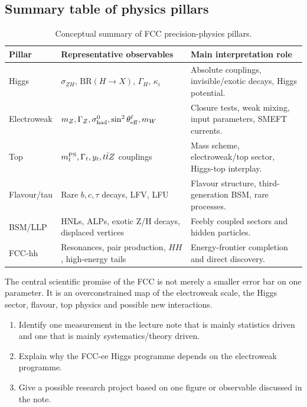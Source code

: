 \documentclass[11pt,a4paper]{article}
\newcommand{\BR}{\mathrm{BR}}
\newcommand{\mZ}{m_Z}
\newcommand{\mW}{m_W}
\newcommand{\sintw}{\sin^2\theta_{\rm eff}^{\ell}}
\numberwithin{equation}{section}
\begin{document}
\subsection{Summary table of physics pillars}
\begin{table}[H]
\centering
\scriptsize
\caption{Conceptual summary of FCC precision-physics pillars.}
\label{tab:summary-pillars}
\begin{tabularx}{\textwidth}{@{}p{2.2cm}p{4.0cm}X@{}}
\toprule
Pillar & Representative observables & Main interpretation role\\
\midrule
Higgs & \(\sigma_{ZH}\), \(\BR(H\to X)\), \(\Gamma_H\), \(\kappa_i\) & Absolute couplings, invisible/exotic decays, Higgs potential.\\
Electroweak & \(\mZ,\Gamma_Z,\sigma^0_{\rm had},\sintw,\mW\) & Closure tests, weak mixing, input parameters, SMEFT currents.\\
Top & \(m_t^{\rm PS},\Gamma_t,y_t,t\bar tZ\) couplings & Mass scheme, electroweak/top sector, Higgs-top interplay.\\
Flavour/tau & Rare \(b,c,\tau\) decays, LFV, LFU & Flavour structure, third-generation BSM, rare processes.\\
BSM/LLP & HNLs, ALPs, exotic Z/H decays, displaced vertices & Feebly coupled sectors and hidden particles.\\
FCC-hh & Resonances, pair production, \(HH\), high-energy tails & Energy-frontier completion and direct discovery.\\
\bottomrule
\end{tabularx}
\end{table}

\begin{takehomebox}
The central scientific promise of the FCC is not merely a smaller error bar on one parameter. It is an overconstrained map of the electroweak scale, the Higgs sector, flavour, top physics and possible new interactions.
\end{takehomebox}

\begin{guidedchecksbox}
\begin{enumerate}[leftmargin=1.6em]
\item Identify one measurement in the lecture note that is mainly statistics driven and one that is mainly systematics/theory driven.
\item Explain why the FCC-ee Higgs programme depends on the electroweak programme.
\item Give a possible research project based on one figure or observable discussed in the note.
\end{enumerate}
\end{guidedchecksbox}
\end{document}
